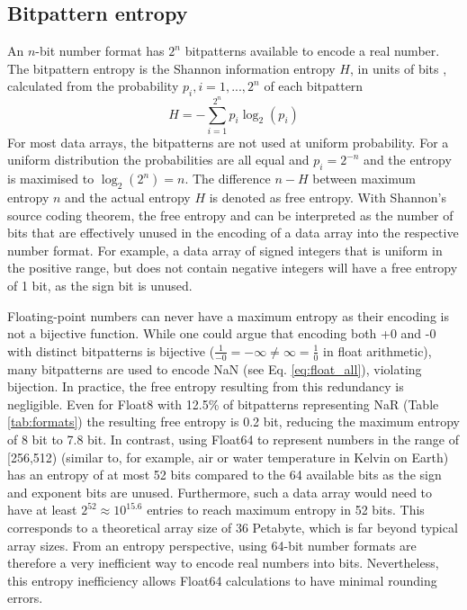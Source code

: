 \subsection{Bitpattern entropy}
\label{sec:bitpattern_entropy}

An $n$-bit number format has $2^n$ bitpatterns available to encode a real number. The bitpattern entropy is the
Shannon information entropy $H$, in units of bits \citep{Shannon1948}, calculated from the probability $p_i, i = 1,...,2^n$ of each bitpattern 
	\begin{equation}
	H = - \sum_{i=1}^{2^n} p_i \log_2(p_i)
	\end{equation}
For most data arrays, the bitpatterns are not used at uniform probability. For a uniform distribution the probabilities are all equal and
$p_i = 2^{-n}$ and the entropy is maximised to $\log_2(2^n) = n$. The difference $n-H$ between maximum entropy $n$ and
the actual entropy $H$ is denoted as free entropy. With Shannon's source coding theorem, the free entropy and can be interpreted as
the number of bits that are effectively unused in the encoding of a data array into the respective number format. For example, a data
array of signed integers that is uniform in the positive range, but does not contain negative integers will have a free entropy of 1 bit,
as the sign bit is unused.

Floating-point numbers can never have a maximum entropy as their encoding is not a bijective function. While one could argue
that encoding both +0 and -0 with distinct bitpatterns is bijective ($\tfrac{1}{-0} = -\infty \neq \infty = \tfrac{1}{0}$ in float arithmetic),
many bitpatterns are used to encode NaN (see Eq. \ref{eq:float_all}), violating bijection. In practice, the free entropy resulting
from this redundancy is negligible. Even for Float8 with 12.5\% of bitpatterns representing NaR (Table \ref{tab:formats}) the 
resulting free entropy is 0.2 bit, reducing the maximum entropy of 8 bit to 7.8 bit. In contrast, using Float64 to represent 
numbers in the range of [256,512) (similar to, for example, air or water temperature in Kelvin on Earth) has an entropy of at 
most 52 bits compared to the 64 available bits as the sign and exponent bits are unused. Furthermore, such a data array
would need to have at least $2^{52} \approx 10^{15.6}$ entries to reach maximum entropy in 52 bits. This corresponds to
a theoretical array size of 36 Petabyte, which is far beyond typical array sizes. From an entropy perspective, using 64-bit number
formats are therefore a very inefficient way to encode real numbers into bits. Nevertheless, this entropy inefficiency allows
Float64 calculations to have minimal rounding errors.

